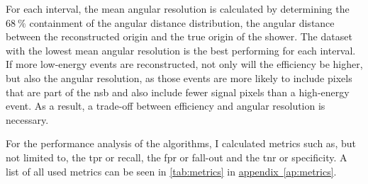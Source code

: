 For each interval, the mean angular resolution is calculated by determining the
\(\SI{68}{\percent}\) containment of the angular distance distribution, \ie the angular distance
between the reconstructed origin and the true origin of the shower.
The dataset with the lowest mean angular resolution is the best performing for each interval.
If more low-energy events are reconstructed, not only will the efficiency be higher, but also the angular resolution,
as those events are more likely to include pixels that are part of the \gls{nsb} and also include fewer signal pixels
than a high-energy event.
As a result, a trade-off between efficiency and angular resolution is necessary.

For the performance analysis of the algorithms, I calculated metrics such as, but not limited to, the \gls{tpr} or recall,
the \gls{fpr} or fall-out and the \gls{tnr} or specificity. A list of all used metrics can be seen in \autoref{tab:metrics}
in \hyperref[ap:metrics]{appendix~\ref{ap:metrics}}.